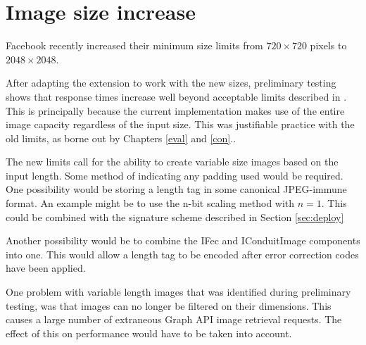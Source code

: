 \chapter{Image size increase}
\label{app:imginc}

Facebook recently increased their minimum size limits from $720 \times 720$ pixels to $2048 \times 2048$. 

After adapting the extension to work with the new sizes, preliminary testing shows that response times increase well beyond acceptable limits described in \cite{response}. This is principally because the current implementation makes use of the entire image capacity regardless of the input size. This was justifiable practice with the old limits, as borne out by Chapters \ref{eval} and \ref{con}..

The new limits call for the ability to create variable size images based on the input length. Some method of indicating any padding used would be required. One possibility would be storing a length tag in some canonical JPEG-immune format. An example might be to use the n-bit scaling method with $n=1$. This could be combined with the signature scheme described in Section \ref{sec:deploy}

Another possibility would be to combine the IFec and IConduitImage components into one. This would allow a length tag to be encoded after error correction codes have been applied.

One problem with variable length images that was identified during preliminary testing, was that images can no longer be filtered on their dimensions. This causes a large number of extraneous Graph API image retrieval requests. The effect of this on performance would have to be taken into account.